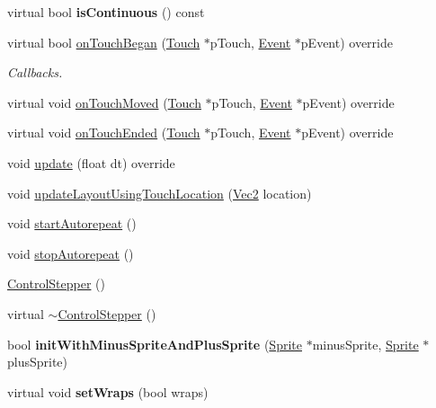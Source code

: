 \begin{DoxyCompactItemize}
virtual bool {\bfseries is\+Continuous} () const
\item 
virtual bool \hyperlink{classControlStepper_a73a5572d0e9ba2a72da9f42884e621e7}{on\+Touch\+Began} (\hyperlink{classTouch}{Touch} $\ast$p\+Touch, \hyperlink{classEvent}{Event} $\ast$p\+Event) override
\begin{DoxyCompactList}\small\item\em Callbacks. \end{DoxyCompactList}\item 
virtual void \hyperlink{classControlStepper_a83a981cc66f6e1669b079b83842d6b79}{on\+Touch\+Moved} (\hyperlink{classTouch}{Touch} $\ast$p\+Touch, \hyperlink{classEvent}{Event} $\ast$p\+Event) override
\item 
virtual void \hyperlink{classControlStepper_a55e6582294a0520d21e397c3a58cf57b}{on\+Touch\+Ended} (\hyperlink{classTouch}{Touch} $\ast$p\+Touch, \hyperlink{classEvent}{Event} $\ast$p\+Event) override
\item 
void \hyperlink{classControlStepper_a29a2d69a159c790691365db8a9f87d33}{update} (float dt) override
\item 
void \hyperlink{classControlStepper_adf8058658ff4555b71ace43f54f60a56}{update\+Layout\+Using\+Touch\+Location} (\hyperlink{classVec2}{Vec2} location)
\item 
void \hyperlink{classControlStepper_ac4d31486530d38b21525418205cfc086}{start\+Autorepeat} ()
\item 
void \hyperlink{classControlStepper_ab7bdf3d5a93aa96f7ba67f2896b2baec}{stop\+Autorepeat} ()
\item 
\hyperlink{classControlStepper_af1c262fd75987df18882ac63fdf0d1bc}{Control\+Stepper} ()
\item 
virtual \hyperlink{classControlStepper_abdd74d9591ddb2a154a395a81b98b031}{$\sim$\+Control\+Stepper} ()
\item 
\mbox{\label{classControlStepper_a405ed5a59df38ba8553ddfac2528e73b}} 
bool {\bfseries init\+With\+Minus\+Sprite\+And\+Plus\+Sprite} (\hyperlink{classSprite}{Sprite} $\ast$minus\+Sprite, \hyperlink{classSprite}{Sprite} $\ast$plus\+Sprite)
\item 
\mbox{\label{classControlStepper_a198ab54db7dc45fca24c876033b81c14}} 
virtual void {\bfseries set\+Wraps} (bool wraps)
\item 
\mbox{\label{classControlStepper_a213641a6d387b08057a54d75d07ba4ee}} 

\end{DoxyCompactItemize}
